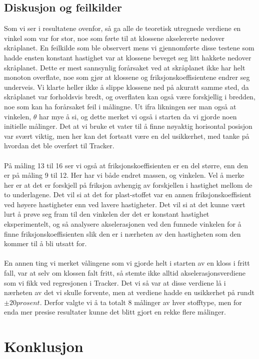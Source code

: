 \documentclass[10pt,a4paper]{report}
\begin{document}
\section*{Diskusjon og feilkilder}
Som vi ser i resultatene ovenfor, så ga alle de teoretisk utregnede verdiene en vinkel som var for stor, noe som førte til at klossene akselererte nedover skråplanet. En feilkilde som ble observert mens vi gjennomførte disse testene som hadde ensten konstant hastighet var at klossene beveget seg litt hakkete nedover skråplanet. Dette er mest sannsynlig forårsaket ved at skråplanet ikke har helt monoton overflate, noe som gjør at klossene og friksjonskoeffisientene endrer seg underveis. Vi klarte heller ikke å slippe klossene ned på akuratt samme sted, da skråplanet var forholdsvis bredt, og overflaten kan også være forskjellig i bredden, noe som kan ha forårsaket feil i målingne. Ut ifra likningen ser man også at vinkelen, $\theta$ har mye å si, og dette merket vi også i starten da vi gjorde noen initielle målinger. Det at vi bruke et vater til å finne nøyaktig horisontal posisjon var svært viktig, men her kan det fortsatt være en del usikkerhet, med tanke på hvordan det ble overført til Tracker. \\
\\På måling 13 til 16 ser vi også at friksjonskoeffisienten er en del større, enn den er på måling 9 til 12. Her har vi både endret massen, og vinkelen. Vel å merke her er at det er forskjell på friksjon avhengig av forskjellen i hastighet mellom de to underlagene. Det vil si at det for plast-stoffet var en annen friksjonskoeffisient ved høyere hastigheter enn ved lavere hastigheter. Det vil si at det kunne vært lurt å prøve seg fram til den vinkelen der det er konstant hastighet eksperimentelt, og så analysere akselerasjonen ved den funnede vinkelen for å finne friksjonskoeffisienten slik den er i nærheten av den hastigheten som den kommer til å bli utsatt for.\\
\\En annen ting vi merket vålingene som vi gjorde helt i starten av en kloss i fritt fall, var at selv om klossen falt fritt, så stemte ikke alltid akselerasjonsverdiene som vi fikk ved regresjonen i Tracker. Det vi så var at disse verdiene lå i nærheten av det vi skulle forvente, men at verdiene hadde en usikkerhet på rundt $\pm 20 prosent$. Derfor valgte vi å ta totalt 8 målinger av hver stofftype, men for enda mer presise resultater kunne det blitt gjort en rekke flere målinger.
\chapter*{Konklusjon}
\end{document}
